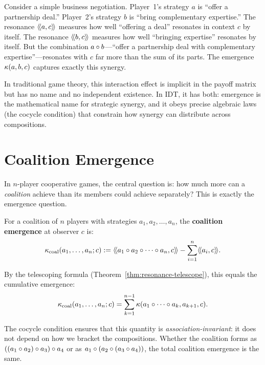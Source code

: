 \begin{interpretation}
Consider a simple business negotiation. Player~1's strategy $a$ is ``offer a
partnership deal.'' Player~2's strategy $b$ is ``bring complementary expertise.''
The resonance $\langle\!\langle a, c \rangle\!\rangle$ measures how well ``offering a deal'' resonates in
context $c$ by itself. The resonance $\langle\!\langle b, c \rangle\!\rangle$ measures how well ``bringing
expertise'' resonates by itself. But the combination $a \circ b$---``offer
a partnership deal with complementary expertise''---resonates with $c$ far more
than the sum of its parts. The emergence $\kappa(a,b,c)$ captures exactly
this synergy.

In traditional game theory, this interaction effect is implicit in the payoff
matrix but has no name and no independent existence. In IDT, it has both:
emergence is the mathematical name for strategic synergy, and it obeys precise
algebraic laws (the cocycle condition) that constrain how synergy can distribute
across compositions.
\end{interpretation}


\section{Coalition Emergence}

In $n$-player cooperative games, the central question is: how much more can a
\emph{coalition} achieve than its members could achieve separately? This is
exactly the emergence question.

\begin{definition}
\label{def:coalition-emergence}
For a coalition of $n$ players with strategies $a_1, a_2, \ldots, a_n$, the
\textbf{coalition emergence} at observer $c$ is:
\[
  \kappa_{\text{coal}}(a_1, \ldots, a_n; c) :=
  \langle\!\langle a_1 \circ a_2 \circ \cdots \circ a_n, c \rangle\!\rangle
  - \sum_{i=1}^n \langle\!\langle a_i, c \rangle\!\rangle.
\]
\end{definition}

By the telescoping formula (Theorem~\ref{thm:resonance-telescope}), this equals
the cumulative emergence:
\[
  \kappa_{\text{coal}}(a_1, \ldots, a_n; c) =
  \sum_{k=1}^{n-1} \kappa(a_1 \circ \cdots \circ a_k, a_{k+1}, c).
\]

The cocycle condition ensures that this quantity is \emph{association-invariant}:
it does not depend on how we bracket the compositions. Whether the coalition
forms as $((a_1 \circ a_2) \circ a_3) \circ a_4$ or as
$a_1 \circ (a_2 \circ (a_3 \circ a_4))$, the total coalition emergence
is the same.

